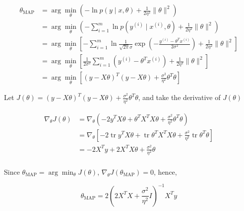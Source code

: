 \begin{answer}
	$$
	\begin{aligned}
		\theta_{\text{MAP}} & = \arg\min_{\theta} \left(-\ln p(y\mid x, \theta) + \frac{1}{2\eta^2}\|\theta\|^2\right)\\
		& = \arg\min_{\theta} \left(-\sum_{i = 1}^m \ln p(y^{(i)}\mid x^{(i)}, \theta) + \frac{1}{2\eta^2}\|\theta\|^2\right)\\
		& = \arg\min_{\theta} \left[-\sum_{i = 1}^m \ln \frac{1}{\sqrt{2\pi}\sigma}\exp\left(-\frac{y^{(i)} - \theta^Tx^{(i)}}{2\sigma^2}\right) + \frac{1}{2\eta^2}\|\theta\|^2\right]\\
		& = \arg\min_{\theta} \left[\frac{1}{2\sigma^2} \sum_{i = 1}^m \left(y^{(i)} - \theta^Tx^{(i)}\right) + \frac{1}{2\eta^2}\|\theta\|^2 \right]\\
		& = \arg\min_{\theta} \left[(y - X\theta)^T(y - X\theta) + \frac{\sigma^2}{\eta^2}\theta^T\theta\right]
	\end{aligned}
	$$
	
	Let $J(\theta) = (y - X\theta)^T(y - X\theta) + \frac{\sigma^2}{\eta^2}\theta^T\theta$, and take the derivative of $J(\theta)$
	
	$$
	\begin{aligned}
		\nabla_{\theta} J(\theta) & = \nabla_{\theta} \left(-2y^T X\theta + \theta^T X^T X\theta + \frac{\sigma^2}{\eta^2}\theta^T\theta\right)\\
		& = \nabla_{\theta} \left[-2\operatorname{tr} y^T X\theta + \operatorname{tr} \theta^T X^T X\theta + \frac{\sigma^2}{\eta^2}\operatorname{tr}\theta^T\theta\right]\\
		& = -2X^T y + 2X^T X \theta + \frac{\sigma^2}{\eta^2}\theta\\
	\end{aligned}
	$$
	
	Since $\theta_{\text{MAP}}=\arg\min_\theta J(\theta)$, $\nabla_{\theta} J(\theta_{\text{MAP}})=0$, hence,
	
	$$
	\theta_{\text{MAP}} = 2\left(2X^T X + \frac{\sigma^2}{\eta^2}I\right)^{-1}X^T y
	$$
\end{answer}
